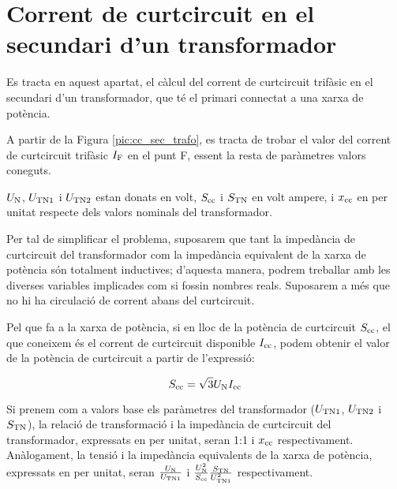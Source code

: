 \section{Corrent de curtcircuit en el  secundari d'un transformador}

 Es tracta en aquest apartat, el c\`{a}lcul del corrent de curtcircuit trif\`{a}sic en el secundari d'un transformador, que t\'{e} el
primari connectat  a una xarxa de pot\`{e}ncia.

A partir de la Figura \vref{pic:cc_sec_trafo}, es tracta de trobar
el valor del corrent de curtcircuit trif\`{a}sic $I_\mathrm{F}$ en el punt
F, essent la resta de par\`{a}metres valors coneguts.

\begin{center}
    
     \label{pic:cc_sec_trafo}
\end{center}

$U_\mathrm{N}$, $U_\mathrm{TN1}$ i $U_\mathrm{TN2}$ estan donats en volt,
$S_\mathrm{cc}$ i $S_\mathrm{TN}$ en volt ampere, i $x_\mathrm{cc}$ en per unitat
respecte dels valors nominals del transformador.


Per tal de simplificar el problema, suposarem que tant la imped\`{a}ncia
de curtcircuit del transformador com la imped\`{a}ncia equivalent de
la xarxa de pot\`{e}ncia s\'{o}n totalment inductives; d'aquesta manera,
podrem treballar amb les diverses variables implicades com si
fossin nombres reals. Suposarem a m\'{e}s que no hi ha circulaci\'{o} de
corrent abans del curtcircuit.

Pel que fa a la xarxa de pot\`{e}ncia, si en lloc de la pot\`{e}ncia de curtcircuit $S_\mathrm{cc}$, el que coneixem \'{e}s el corrent de curtcircuit
disponible $I_\mathrm{cc}$, podem obtenir el valor de la pot\`{e}ncia de
curtcircuit a partir de l'expressi\'{o}:

\begin{equation}
    S_\mathrm{cc} = \sqrt{3} U_\mathrm{N} I_\mathrm{cc}
\end{equation}

 Si prenem com a valors base els
par\`{a}metres del transformador ($U_\mathrm{TN1}$, $U_\mathrm{TN2}$ i
$S_\mathrm{TN}$), la relaci\'{o} de transformaci\'{o} i la imped\`{a}ncia de curtcircuit del transformador, expressats en per unitat, seran 1:1 i
$x_\mathrm{cc}$ respectivament. An\`{a}logament, la tensi\'{o} i la imped\`{a}ncia
equivalents de la xarxa de pot\`{e}ncia, expressats en per unitat, seran
$\frac{U_\mathrm{N}}{U_\mathrm{TN1}}$ i $\frac{U_\mathrm{N}^2}{S_\mathrm{cc}}
\frac{S_\mathrm{TN}}{U_\mathrm{TN1}^2}$ respectivament.

